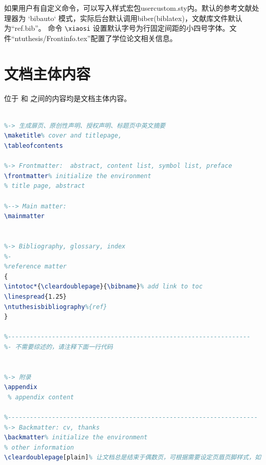 如果用户有自定义命令，可以写入样式宏包usercustom.sty内。默认的参考文献处理器为 `bibauto` 模式，实际后台默认调用biber(biblatex)，文献库文件默认为“ref.bib”。 命令 \verb|\xiaosi| 设置默认字号为行固定间距的小四号字体。文件“ntuthesis/Frontinfo.tex”配置了学位论文相关信息。

\section{文档主体内容}
位于 \verb||和 \verb|| 之间的内容均是文档主体内容。
\begin{lstlisting}[language=tex]

%-> 生成扉页、原创性声明、授权声明、标题页中英文摘要
\maketitle% cover and titlepage,
\tableofcontents

%-> Frontmatter:  abstract, content list, symbol list, preface
\frontmatter% initialize the environment
% title page, abstract

%--> Main matter: 
\mainmatter


%-> Bibliography, glossary, index
%-
%reference matter
{
\intotoc*{\cleardoublepage}{\bibname}% add link to toc
\linespread{1.25}
\ntuthesisbibliography%{ref}
}

%------------------------------------------------------------------
%- 不需要综述的，请注释下面一行代码


%-> 附录
\appendix
 % appendix content

%--------------------------------------------------------------------
%-> Backmatter: cv, thanks
\backmatter% initialize the environment
% other information
\cleardoublepage[plain]% 让文档总是结束于偶数页，可根据需要设定页眉页脚样式，如 [noheaderstyle]

\end{lstlisting}
%

